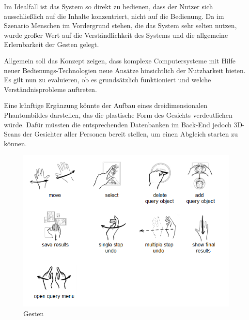 \documentclass{sigchi-ext}
\begin{document}
Im Idealfall ist das System so direkt zu bedienen, dass der Nutzer
sich ausschließlich auf die Inhalte konzentriert, nicht auf die
Bedienung.
Da im Szenario Menschen im Vordergrund stehen, die das System sehr
selten nutzen, wurde großer Wert auf die Verständlichkeit des Systems
und die allgemeine Erlernbarkeit der Gesten gelegt.
 
Allgemein soll das Konzept zeigen, dass komplexe Computersysteme mit Hilfe neuer Bedienungs-Technologien neue Ansätze hinsichtlich der Nutzbarkeit bieten.
Es gilt nun zu evaluieren, ob es grundsätzlich funktioniert und welche
Verständnisprobleme auftreten.

Eine künftige Ergänzung könnte der Aufbau eines dreidimensionalen Phantombildes 
darstellen, das die plastische Form des Gesichts verdeutlichen würde. Dafür müssten die entsprechenden Datenbanken im Back-End jedoch 3D-Scans der Gesichter aller Personen bereit stellen, um einen Abgleich starten zu können.

\begin{figure}
  \centering
  \includegraphics[width=1.8\marginparwidth]{figures/gestures.png}
  \caption{Gesten}
  \label{fig:gestures}
\end{figure}

\balance{} 




\end{document}
